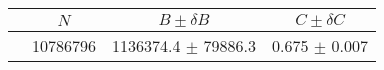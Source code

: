 \begin{tabular}{lccc}
\hline
    &   $N$   & $B \pm \delta B$  &  $C \pm \delta C$ \\
\hline
                               & 10786796   & 1136374.4  $\pm$ 79886.3 & 0.675      $\pm$ 0.007 \\
\hline
\end{tabular}
